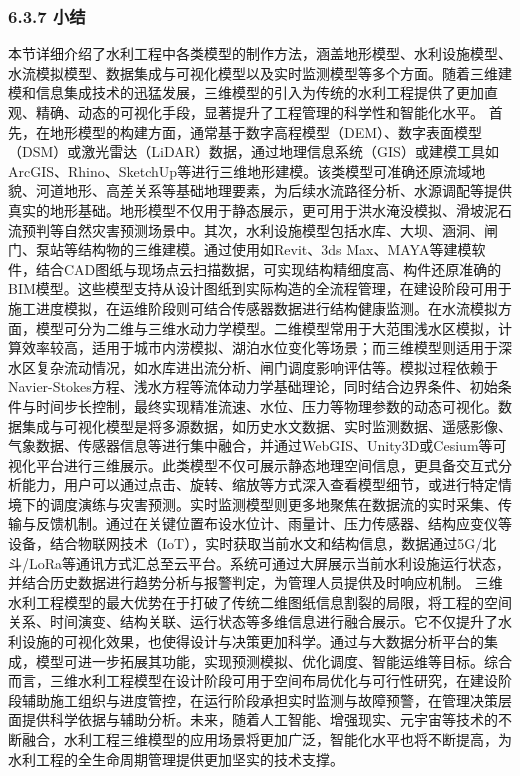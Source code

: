 \subsubsection{6.3.7 小结}\label{ux5c0fux7ed3-2}
本节详细介绍了水利工程中各类模型的制作方法，涵盖地形模型、水利设施模型、水流模拟模型、数据集成与可视化模型以及实时监测模型等多个方面。随着三维建模和信息集成技术的迅猛发展，三维模型的引入为传统的水利工程提供了更加直观、精确、动态的可视化手段，显著提升了工程管理的科学性和智能化水平。
首先，在地形模型的构建方面，通常基于数字高程模型（DEM）、数字表面模型（DSM）或激光雷达（LiDAR）数据，通过地理信息系统（GIS）或建模工具如ArcGIS、Rhino、SketchUp等进行三维地形建模。该类模型可准确还原流域地貌、河道地形、高差关系等基础地理要素，为后续水流路径分析、水源调配等提供真实的地形基础。地形模型不仅用于静态展示，更可用于洪水淹没模拟、滑坡泥石流预判等自然灾害预测场景中。其次，水利设施模型包括水库、大坝、涵洞、闸门、泵站等结构物的三维建模。通过使用如Revit、3ds
Max、MAYA等建模软件，结合CAD图纸与现场点云扫描数据，可实现结构精细度高、构件还原准确的BIM模型。这些模型支持从设计图纸到实际构造的全流程管理，在建设阶段可用于施工进度模拟，在运维阶段则可结合传感器数据进行结构健康监测。在水流模拟方面，模型可分为二维与三维水动力学模型。二维模型常用于大范围浅水区模拟，计算效率较高，适用于城市内涝模拟、湖泊水位变化等场景；而三维模型则适用于深水区复杂流动情况，如水库进出流分析、闸门调度影响评估等。模拟过程依赖于Navier-Stokes方程、浅水方程等流体动力学基础理论，同时结合边界条件、初始条件与时间步长控制，最终实现精准流速、水位、压力等物理参数的动态可视化。数据集成与可视化模型是将多源数据，如历史水文数据、实时监测数据、遥感影像、气象数据、传感器信息等进行集中融合，并通过WebGIS、Unity3D或Cesium等可视化平台进行三维展示。此类模型不仅可展示静态地理空间信息，更具备交互式分析能力，用户可以通过点击、旋转、缩放等方式深入查看模型细节，或进行特定情境下的调度演练与灾害预测。实时监测模型则更多地聚焦在数据流的实时采集、传输与反馈机制。通过在关键位置布设水位计、雨量计、压力传感器、结构应变仪等设备，结合物联网技术（IoT），实时获取当前水文和结构信息，数据通过5G/北斗/LoRa等通讯方式汇总至云平台。系统可通过大屏展示当前水利设施运行状态，并结合历史数据进行趋势分析与报警判定，为管理人员提供及时响应机制。
三维水利工程模型的最大优势在于打破了传统二维图纸信息割裂的局限，将工程的空间关系、时间演变、结构关联、运行状态等多维信息进行融合展示。它不仅提升了水利设施的可视化效果，也使得设计与决策更加科学。通过与大数据分析平台的集成，模型可进一步拓展其功能，实现预测模拟、优化调度、智能运维等目标。综合而言，三维水利工程模型在设计阶段可用于空间布局优化与可行性研究，在建设阶段辅助施工组织与进度管控，在运行阶段承担实时监测与故障预警，在管理决策层面提供科学依据与辅助分析。未来，随着人工智能、增强现实、元宇宙等技术的不断融合，水利工程三维模型的应用场景将更加广泛，智能化水平也将不断提高，为水利工程的全生命周期管理提供更加坚实的技术支撑。
